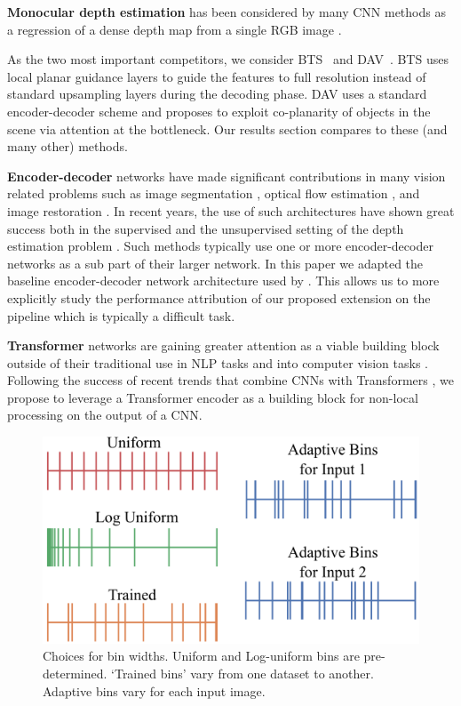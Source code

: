 \documentclass[final]{cvpr}
\begin{document}
\textbf{Monocular depth estimation} has been considered by many CNN methods as a regression of a dense depth map from a single RGB image \cite{Eigen2014,Laina2016,Xu2017,Hao2018DetailPD,Xu2018StructuredAG,Fu2018DeepOR,Hu2018RevisitingSI,Alhashim2018,bts_lee2019big,dav_huynh2020guiding}. 

As the two most important competitors, we consider BTS~\cite{bts_lee2019big}
and DAV~\cite{dav_huynh2020guiding}. BTS uses local planar guidance layers to guide the features to full resolution instead of standard upsampling layers during the decoding phase. DAV uses a standard encoder-decoder scheme and proposes to exploit co-planarity of objects in the scene via attention at the bottleneck. Our results section compares to these (and many other) methods.


\textbf{Encoder-decoder} networks have made significant contributions in many vision related problems such as image segmentation \cite{Ronneberger2015u}, optical flow estimation \cite{Dosovitskiy2015}, and image restoration \cite{LehtinenMHLKAA18}. In recent years, the use of such architectures have shown great success both in the supervised and the unsupervised setting of the depth estimation problem \cite{Godard2017,Ummenhofer2017,Huang2018DeepMVSLM,Zhou2018DeepTAMDT,Alhashim2018}. Such methods typically use one or more encoder-decoder networks as a sub part of their larger network. In this paper we adapted the baseline encoder-decoder network architecture used by \cite{Alhashim2018}. This allows us to more explicitly study the performance attribution of our proposed extension on the pipeline which is typically a difficult task.

\textbf{Transformer} networks are gaining greater attention as a viable building block outside of their traditional use in NLP tasks and into computer vision tasks \cite{pmlr-v80-parmar18a,Wang_2018_CVPR,detr2020,dosovitskiy2020}. Following the success of recent trends that combine CNNs with Transformers \cite{detr2020}, we propose to leverage a Transformer encoder as a building block for non-local processing on the output of a CNN.

\begin{figure}[t]
\centering
   \includegraphics[width=0.7\linewidth]{bin-types-v2.png}
   \caption{Choices for bin widths. Uniform and Log-uniform bins are pre-determined. `Trained bins' vary from one dataset to another. Adaptive bins vary for each input image.}
\label{fig:binchoices}
\end{figure}
\end{document}
